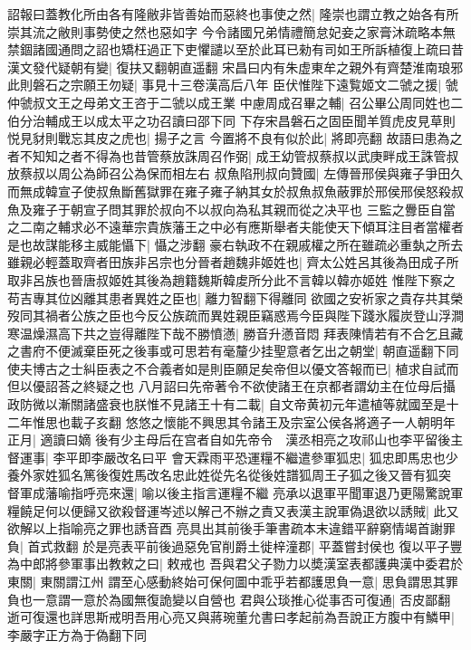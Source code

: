 詔報曰蓋教化所由各有隆敝非皆善始而惡終也事使之然|{
	隆崇也謂立教之始各有所崇其流之敝則事勢使之然也惡如字}
今令諸國兄弟情禮簡怠妃妾之家膏沐疏略本無禁錮諸國通問之詔也矯枉過正下吏懼譴以至於此耳已勑有司如王所訴植復上疏曰昔漢文發代疑朝有變|{
	復扶又翻朝直遥翻}
宋昌曰内有朱虚東牟之親外有齊楚淮南琅邪此則磐石之宗願王勿疑|{
	事見十三卷漢高后八年}
臣伏惟陛下遠覧姬文二虢之援|{
	虢仲虢叔文王之母弟文王咨于二虢以成王業}
中慮周成召畢之輔|{
	召公畢公周同姓也二伯分治輔成王以成太平之功召讀曰邵下同}
下存宋昌磐石之固臣聞羊質虎皮見草則悦見豺則戰忘其皮之虎也|{
	揚子之言}
今置將不良有似於此|{
	將即亮翻}
故語曰患為之者不知知之者不得為也昔管蔡放誅周召作弼|{
	成王幼管叔蔡叔以武庚畔成王誅管叔放蔡叔以周公為師召公為保而相左右}
叔魚陷刑叔向贊國|{
	左傳晉邢侯與雍子爭田久而無成韓宣子使叔魚斷舊獄罪在雍子雍子納其女於叔魚叔魚蔽罪於邢侯邢侯怒殺叔魚及雍子于朝宣子問其罪於叔向不以叔向為私其親而從之决平也}
三監之釁臣自當之二南之輔求必不遠華宗貴族藩王之中必有應斯舉者夫能使天下傾耳注目者當權者是也故謀能移主威能懾下|{
	懾之涉翻}
豪右執政不在親戚權之所在雖疏必重埶之所去雖親必輕蓋取齊者田族非呂宗也分晉者趙魏非姬姓也|{
	齊太公姓呂其後為田成子所取非呂族也晉唐叔姬姓其後為趙籍魏斯韓䖍所分此不言韓以韓亦姬姓}
惟陛下察之苟吉專其位凶離其患者異姓之臣也|{
	離力智翻下得離同}
欲國之安祈家之貴存共其榮歿同其禍者公族之臣也今反公族疏而異姓親臣竊惑焉今臣與陛下踐氷履炭登山浮澗寒温燥濕高下共之豈得離陛下哉不勝憤懣|{
	勝音升懣音悶}
拜表陳情若有不合乞且藏之書府不便滅棄臣死之後事或可思若有毫釐少挂聖意者乞出之朝堂|{
	朝直遥翻下同}
使夫博古之士糾臣表之不合義者如是則臣願足矣帝但以優文答報而已|{
	植求自試而但以優詔荅之終疑之也}
八月詔曰先帝著令不欲使諸王在京都者謂幼主在位母后攝政防微以漸關諸盛衰也朕惟不見諸王十有二載|{
	自文帝黄初元年遣植等就國至是十二年惟思也載子亥翻}
悠悠之懷能不興思其令諸王及宗室公侯各將適子一人朝明年正月|{
	適讀曰嫡}
後有少主母后在宫者自如先帝令　漢丞相亮之攻祁山也李平留後主督運事|{
	李平即李嚴改名曰平}
會天霖雨平恐運糧不繼遣參軍狐忠|{
	狐忠即馬忠也少養外家姓狐名篤後復姓馬改名忠此姓從先名從後姓譜狐周王子狐之後又晉有狐突}
督軍成藩喻指呼亮來還|{
	喻以後主指言運糧不繼}
亮承以退軍平聞軍退乃更陽驚說軍糧饒足何以便歸又欲殺督運岑述以解己不辦之責又表漢主說軍偽退欲以誘賊|{
	此又欲解以上指喻亮之罪也誘音酉}
亮具出其前後手筆書疏本末違錯平辭窮情竭首謝罪負|{
	首式救翻}
於是亮表平前後過惡免官削爵土徙梓潼郡|{
	平蓋嘗封侯也}
復以平子豐為中郎將參軍事出教敕之曰|{
	敕戒也}
吾與君父子勠力以奬漢室表都護典漢中委君於東關|{
	東關謂江州}
謂至心感動終始可保何圖中乖乎若都護思負一意|{
	思負謂思其罪負也一意謂一意於為國無復詭變以自營也}
君與公琰推心從事否可復通|{
	否皮鄙翻}
逝可復還也詳思斯戒明吾用心亮又與蔣琬董允書曰孝起前為吾說正方腹中有鱗甲|{
	李嚴字正方為于偽翻下同}
